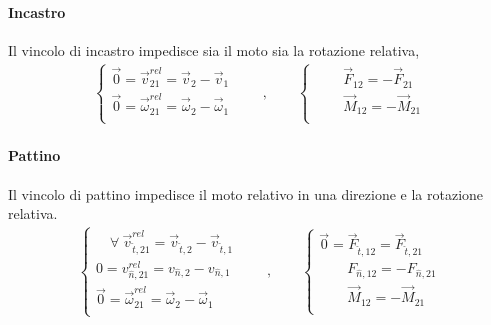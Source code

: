 \documentclass[letterpaper,10pt,italian]{jupyterBook}
\begin{document}
\paragraph{Incastro}
\label{\detokenize{ch/mechanics/actions-examples:incastro}}
\sphinxAtStartPar
Il vincolo di incastro impedisce sia il moto sia la rotazione relativa,
\begin{equation*}
\begin{split}
\begin{cases}
  \vec{0} = \vec{v}^{rel}_{21}     = \vec{v}_{2}     - \vec{v}_{1} \\
  \vec{0} = \vec{\omega}^{rel}_{21} = \vec{\omega}_{2} - \vec{\omega}_{1} \\
\end{cases}
\qquad , \qquad
\begin{cases}
  \qquad \vec{F}_{12} = - \vec{F}_{21} \\
  \qquad \vec{M}_{12} = - \vec{M}_{21} \\
\end{cases}
\end{split}
\end{equation*}

\paragraph{Pattino}
\label{\detokenize{ch/mechanics/actions-examples:pattino}}
\sphinxAtStartPar
Il vincolo di pattino impedisce il moto relativo in una direzione e la rotazione relativa.
\begin{equation*}
\begin{split}
\begin{cases}
  \quad \forall \ \vec{v}^{rel}_{\hat{t},21}     = \vec{v}_{\hat{t},2}     - \vec{v}_{\hat{t},1} \\
          0  = v^{rel}_{\hat{n},21}     = v_{\hat{n},2}     - v_{\hat{n},1} \\
  \vec{0} = \vec{\omega}^{rel}_{21} = \vec{\omega}_{2} - \vec{\omega}_{1} \\
\end{cases}
\qquad , \qquad
\begin{cases}
  \vec{0} = \vec{F}_{\hat{t},12} = \vec{F}_{\hat{t},21} \\
  \qquad F_{\hat{n},12} = - F_{\hat{n},21} \\
  \qquad \vec{M}_{12} = - \vec{M}_{21} \\
\end{cases}
\end{split}
\end{equation*}
\end{document}
